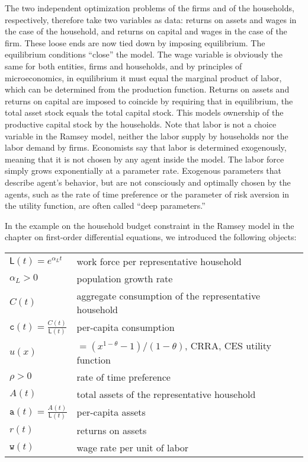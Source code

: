 \documentclass[graybox]{svmult}
\begin{document}
\smallskip

The two independent optimization problems of the firms and of the households, respectively, therefore take two variables as data:  returns on assets and wages in the case of the household, and returns on capital and wages in the case of the firm.  These loose ends are now tied down by imposing equilibrium.  The equilibrium conditions ``close'' the model. The wage variable is obviously the same for both entities, firms and households, and by principles of microeconomics, in equilibrium it must equal the marginal product of labor, which can be determined from the production function.  Returns on assets and returns on capital are imposed to coincide by requiring that in equilibrium, the total asset stock equals the total capital stock. This models ownership of the productive capital stock by the households.  Note that labor is not a choice variable in the Ramsey model, neither the labor supply by households nor the labor demand by firms.  Economists say that labor is determined exogenously, meaning that it is not chosen by any agent inside the model. The labor force simply grows exponentially at a parameter rate.  Exogenous parameters that describe agent's behavior, but are not consciously and optimally chosen by the agents, such as the rate of time preference or the parameter of risk aversion in the utility function, are often called ``deep parameters.''

\smallskip

In the example on the household budget constraint in the Ramsey model in the chapter on first-order differential equations, we introduced the following objects:

\smallskip

\begin{tabular}{ll}
$\mathsf{L}(t) = e^{\alpha_L t}$ & work force per representative household\\
$\alpha_L>0$ & population growth rate \\
$C(t)$ & aggregate consumption of the representative household\\
$\mathtt{c}(t)=\frac{C(t)}{\mathsf{L}(t)}$ & per-capita consumption\\
$u(x)$ & $=(x^{1-\theta}-1)/(1-\theta)$, CRRA, CES utility function \\
$\rho>0$ & rate of time preference \\
$A(t)$ & total assets of the representative household\\
$\mathtt{a}(t) = \frac{A(t)}{\mathsf{L}(t)}$ & per-capita assets \\
$r(t)$ & returns on assets \\
$\mathtt{w}(t)$ & wage rate per unit of labor
\end{tabular}
\end{document}
